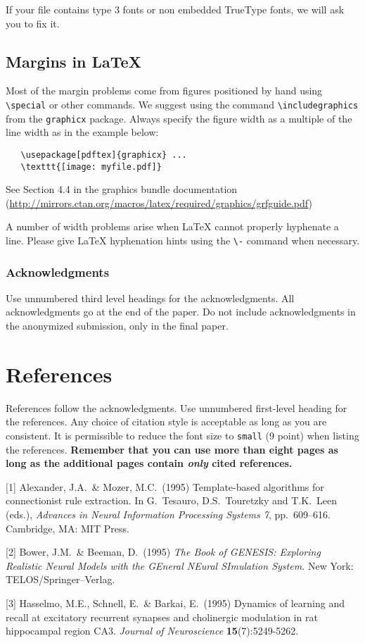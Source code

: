 \documentclass{article}
\begin{document}
If your file contains type 3 fonts or non embedded TrueType fonts, we will ask
you to fix it.

\subsection{Margins in \LaTeX{}}

Most of the margin problems come from figures positioned by hand using
\verb+\special+ or other commands. We suggest using the command
\verb+\includegraphics+ from the \verb+graphicx+ package. Always specify the
figure width as a multiple of the line width as in the example below:
\begin{verbatim}
   \usepackage[pdftex]{graphicx} ...
   \texttt{[image: myfile.pdf]}
\end{verbatim}
See Section 4.4 in the graphics bundle documentation
(\url{http://mirrors.ctan.org/macros/latex/required/graphics/grfguide.pdf})

A number of width problems arise when \LaTeX{} cannot properly hyphenate a
line. Please give LaTeX hyphenation hints using the \verb+\-+ command when
necessary.

\subsubsection*{Acknowledgments}

Use unnumbered third level headings for the acknowledgments. All acknowledgments
go at the end of the paper. Do not include acknowledgments in the anonymized
submission, only in the final paper.

\section*{References}

References follow the acknowledgments. Use unnumbered first-level heading for
the references. Any choice of citation style is acceptable as long as you are
consistent. It is permissible to reduce the font size to \verb+small+ (9 point)
when listing the references. {\bf Remember that you can use more than eight
  pages as long as the additional pages contain \emph{only} cited references.}
\medskip

\small

[1] Alexander, J.A.\ \& Mozer, M.C.\ (1995) Template-based algorithms for
connectionist rule extraction. In G.\ Tesauro, D.S.\ Touretzky and T.K.\ Leen
(eds.), {\it Advances in Neural Information Processing Systems 7},
pp.\ 609--616. Cambridge, MA: MIT Press.

[2] Bower, J.M.\ \& Beeman, D.\ (1995) {\it The Book of GENESIS: Exploring
  Realistic Neural Models with the GEneral NEural SImulation System.}  New York:
TELOS/Springer--Verlag.

[3] Hasselmo, M.E., Schnell, E.\ \& Barkai, E.\ (1995) Dynamics of learning and
recall at excitatory recurrent synapses and cholinergic modulation in rat
hippocampal region CA3. {\it Journal of Neuroscience} {\bf 15}(7):5249-5262.
\end{document}
